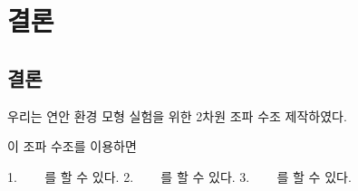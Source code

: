 \section{결론}
\subsection{결론}


우리는 연안 환경 모형 실험을 위한 2차원 조파 수조 제작하였다.

이 조파 수조를 이용하면

1. ~~~ 를 할 수 있다.
2. ~~~ 를 할 수 있다. 
3. ~~~ 를 할 수 있다.
